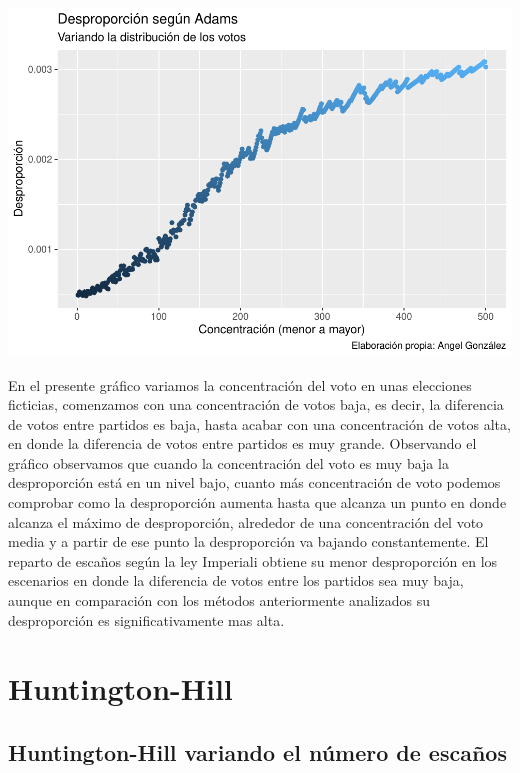 \documentclass[12pt,a4paper,]{book}
\numberwithin{dummy}{section}
\theoremstyle{ocrenumbox}
\theoremstyle{blacknumex}
\theoremstyle{blacknumbox}
\theoremstyle{ocrenum}
\theoremstyle{ocrenum}
\begin{document}
\begin{center}\includegraphics[width=0.95\linewidth]{figurasR/unnamed-chunk-33-1} \end{center}

En el presente gráfico variamos la concentración del voto en unas
elecciones ficticias, comenzamos con una concentración de votos baja, es
decir, la diferencia de votos entre partidos es baja, hasta acabar con
una concentración de votos alta, en donde la diferencia de votos entre
partidos es muy grande. Observando el gráfico observamos que cuando la
concentración del voto es muy baja la desproporción está en un nivel
bajo, cuanto más concentración de voto podemos comprobar como la
desproporción aumenta hasta que alcanza un punto en donde alcanza el
máximo de desproporción, alrededor de una concentración del voto media y
a partir de ese punto la desproporción va bajando constantemente. El
reparto de escaños según la ley Imperiali obtiene su menor desproporción
en los escenarios en donde la diferencia de votos entre los partidos sea
muy baja, aunque en comparación con los métodos anteriormente analizados
su desproporción es significativamente mas alta.

\hypertarget{huntington-hill}{%
\section{Huntington-Hill}\label{huntington-hill}}

\hypertarget{huntington-hill-variando-el-nuxfamero-de-escauxf1os}{%
\subsection{Huntington-Hill variando el número de
escaños}\label{huntington-hill-variando-el-nuxfamero-de-escauxf1os}}
\end{document}

